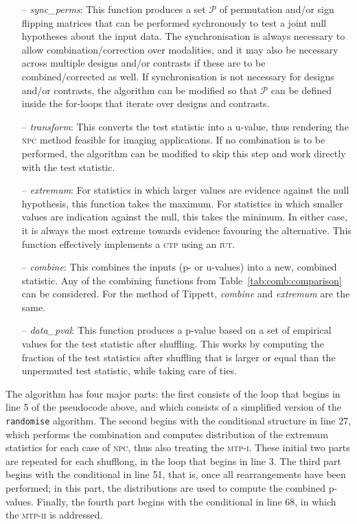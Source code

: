 \begin{itemize}
\item[--] \emph{sync\_perms}: This function produces a set $\mathcal{P}$ of permutation and/or sign flipping matrices that can be performed sychronously to test a joint null hypotheses about the input data. The synchronisation is always necessary to allow combination/correction over modalities, and it may also be necessary across multiple designs and/or contrasts if these are to be combined/corrected as well. If synchronisation is not necessary for designs and/or contrasts, the algorithm can be modified so that $\mathcal{P}$ can be defined inside the for-loops that iterate over designs and contrasts.
\item[--] \emph{transform}: This converts the test statistic into a u-value, thus rendering the \textsc{npc} method feasible for imaging applications. If no combination is to be performed, the algorithm can be modified to skip this step and work directly with the test statistic.
\item[--] \emph{extremum}: For statistics in which larger values are evidence against the null hypothesis, this function takes the maximum. For statistics in which smaller values are indication against the null, this takes the minimum. In either case, it is always the most extreme towards evidence favouring the alternative. This function effectively implements a \textsc{ctp} using an \textsc{iut}.
\item[--] \emph{combine}: This combines the inputs (p- or u-values) into a new, combined statistic. Any of the combining functions from Table~\ref{tab:comb:comparison} can be considered. For the method of Tippett, \emph{combine} and \emph{extremum} are the same.
\item[--] \emph{data\_pval}: This function produces a p-value based on a set of empirical values for the test statistic after shuffling. This works by computing the fraction of the test statistics after shuffling that is larger or equal than the unpermuted test statistic, while taking care of ties.
\end{itemize}

The algorithm has four major parts: the first consists of the loop that begins in line 5 of the pseudocode above, and which consists of a simplified version of the \texttt{randomise} algorithm. The second begins with the conditional structure in line 27, which performs the combination and computes distribution of the extremum statistics for each case of \textsc{npc}, thus also treating the \textsc{mtp-i}. These initial two parts are repeated for each shufflong, in the loop that begins in line 3. The third part begins with the conditional in line 51, that is, once all rearrangements have been performed; in this part, the distributions are used to compute the combined p-values. Finally, the fourth part begins with the conditional in line 68, in which the \textsc{mtp-ii} is addressed.


